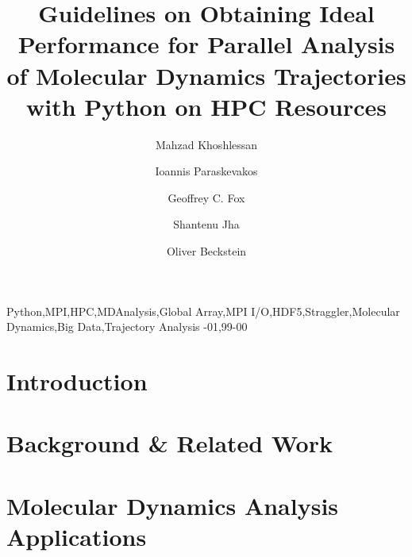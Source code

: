 \documentclass[review]{elsarticle}
\begin{document}
\begin{frontmatter}    

\title{Guidelines on Obtaining Ideal Performance for Parallel Analysis of Molecular Dynamics Trajectories with Python on HPC Resources}

\author[ASUphysics]{Mahzad Khoshlessan}

\author[Rutgers]{Ioannis Paraskevakos}

\author[IndianaDSC]{Geoffrey C. Fox}

\author[Rutgers]{Shantenu Jha}

\author[ASUphysics,ASUCBP]{Oliver Beckstein}

\address[ASUphysics]{Department of Physics, Arizona State University,
  Tempe, AZ 85281, USA}
\address[ASUCBP]{Center for Biological Physics, Arizona State University,
  Tempe, AZ 85281, USA}
\address[Rutgers]{Department of Electrical \& Computer Engineering,
  Rutgers University, Piscataway, NJ 08854, USA}
\address[IndianaDSC]{Digital Science Center, Indiana University,
  Bloomington, IN 47405}

    


\begin{keyword}
Python\sep MPI\sep HPC\sep MDAnalysis\sep Global Array\sep MPI I/O\sep HDF5\sep Straggler\sep Molecular Dynamics\sep Big Data\sep Trajectory Analysis
-01\sep  99-00
\end{keyword}

\end{frontmatter}

\linenumbers

\section{Introduction}


\section{Background \& Related Work}


\section{Molecular Dynamics Analysis Applications}

\end{document}
